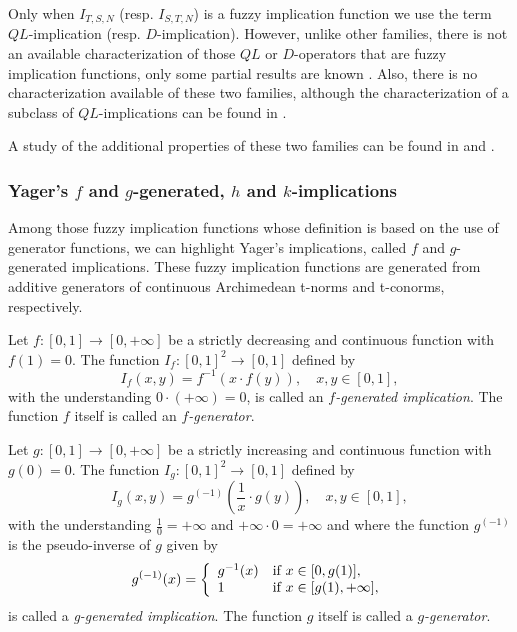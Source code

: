 Only when $I_{T,S,N}$ (resp. $I_{S,T,N}$) is a fuzzy implication function we use the term $QL$-implication (resp. $D$-implication). However, unlike other families, there is not an available characterization of those $QL$ or $D$-operators that are fuzzy implication functions, only some partial results are known \cite{Mas2006}. Also, there is no characterization available of these two families, although the characterization of a subclass of $QL$-implications can be found in \cite{Shi2008}.

A study of the additional properties of these two families can be found in \cite[Section 2.6]{Baczynski2008} and \cite{Trillas2000,Trillas2005,Mas2006}.

\subsubsection{Yager's $f$ and $g$-generated, $h$ and $k$-implications}

Among those fuzzy implication functions whose definition is based on the use of generator functions, we can highlight Yager's implications, called $f$ and $g$-generated implications. These fuzzy implication functions are generated from additive generators of continuous Archimedean t-norms and t-conorms, respectively.

\begin{definition}\label{def:fimpl} 
	Let $f:[0,1] \to [0,+\infty]$ be a strictly decreasing and continuous function with $f(1)=0$. The function $I_f:[0,1]^2 \to [0,1]$ defined by
	$$ I_f(x,y)=f^{-1}(x \cdot f(y)), \quad x,y \in [0,1],$$
	with the understanding $0 \cdot (+ \infty) = 0$, is called an \emph{$f$-generated implication}. The function $f$ itself is called an \emph{$f$-generator}.
	\label{yager_f}
\end{definition}
\begin{definition}\label{def:gimpl} 
	Let $g:[0,1] \to [0,+\infty]$ be a strictly increasing and continuous function with $g(0)=0$. The function $I_g:[0,1]^2 \to [0,1]$ defined by
	$$I_g(x,y)=g^{(-1)}\left(\frac{1}{x}\cdot g(y)\right), \quad x,y \in [0,1],$$
	with the understanding $\frac{1}{0}=+\infty$ and $+\infty \cdot 0 = +\infty$ and where the function $g^{(-1)}$ is the pseudo-inverse of $g$ given by
	$$g^{(-1)}(x)=\left \{\begin{array}{ll} g^{-1}(x)& \hbox{if } x \in [0,g(1)],\\ 1&\hbox{if } x \in [g(1),+\infty],\end{array}\right.$$
	 is called a \emph{g-generated implication}. The function $g$ itself is called a \emph{$g$-generator}.
	\label{yager_g}
\end{definition}

